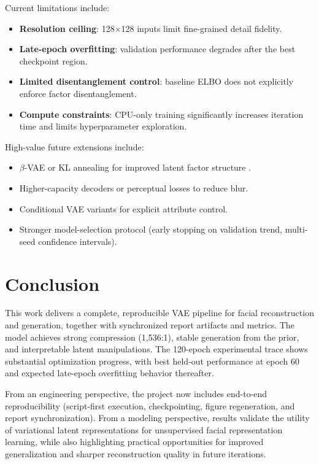 \documentclass[conference]{IEEEtran}
\begin{document}
Current limitations include:
\begin{itemize}
    \item \textbf{Resolution ceiling}: 128×128 inputs limit fine-grained detail fidelity.
    \item \textbf{Late-epoch overfitting}: validation performance degrades after the best checkpoint region.
    \item \textbf{Limited disentanglement control}: baseline ELBO does not explicitly enforce factor disentanglement.
    \item \textbf{Compute constraints}: CPU-only training significantly increases iteration time and limits hyperparameter exploration.
\end{itemize}

High-value future extensions include:
\begin{itemize}
    \item $\beta$-VAE or KL annealing for improved latent factor structure \cite{higgs2017beta}.
    \item Higher-capacity decoders or perceptual losses to reduce blur.
    \item Conditional VAE variants for explicit attribute control.
    \item Stronger model-selection protocol (early stopping on validation trend, multi-seed confidence intervals).
\end{itemize}

\section{Conclusion}

This work delivers a complete, reproducible VAE pipeline for facial reconstruction and generation, together with synchronized report artifacts and metrics. The model achieves strong compression (1,536:1), stable generation from the prior, and interpretable latent manipulations. The 120-epoch experimental trace shows substantial optimization progress, with best held-out performance at epoch 60 and expected late-epoch overfitting behavior thereafter.

From an engineering perspective, the project now includes end-to-end reproducibility (script-first execution, checkpointing, figure regeneration, and report synchronization). From a modeling perspective, results validate the utility of variational latent representations for unsupervised facial representation learning, while also highlighting practical opportunities for improved generalization and sharper reconstruction quality in future iterations.
\end{document}
